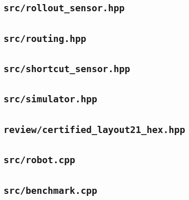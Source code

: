 \subsection*{\texttt{src/rollout\_sensor.hpp}}

\subsection*{\texttt{src/routing.hpp}}

\subsection*{\texttt{src/shortcut\_sensor.hpp}}

\subsection*{\texttt{src/simulator.hpp}}

\subsection*{\texttt{review/certified\_layout21\_hex.hpp}}

\subsection*{\texttt{src/robot.cpp}}

\subsection*{\texttt{src/benchmark.cpp}}

